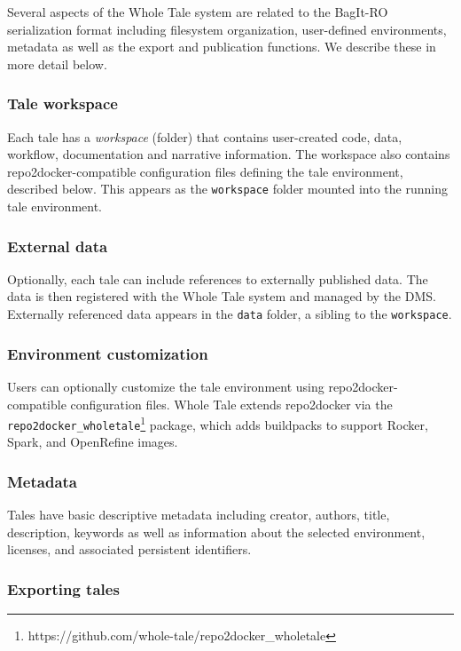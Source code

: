 \documentclass[conference]{IEEEtran}
\begin{document}
Several aspects of the Whole Tale system are related to the BagIt-RO serialization format including filesystem organization, user-defined environments, metadata as well as the export and publication functions. We describe these in more detail below.

\subsubsection{Tale workspace}
Each tale has a \emph{workspace} (folder) that contains user-created code, data, workflow, documentation and narrative information. The workspace also contains repo2docker-compatible configuration files defining the tale environment, described below. This appears as the \texttt{workspace} folder mounted into the running tale environment.

\subsubsection{External data}
Optionally, each tale can include references to externally published data. The data is then registered with the Whole Tale system and managed by the DMS. Externally referenced data appears in the \texttt{data} folder, a sibling to the \texttt{workspace}.

\subsubsection{Environment customization}
Users can optionally customize the tale environment using repo2docker-compatible configuration files. Whole Tale extends repo2docker via the \texttt{repo2docker\_wholetale}\footnote{https://github.com/whole-tale/repo2docker\_wholetale} package, which adds buildpacks to support Rocker, Spark, and OpenRefine images. 

\subsubsection{Metadata}

Tales have basic descriptive metadata including creator, authors, title, description, keywords as well as information about the selected environment, licenses, and associated persistent identifiers.

\subsubsection{Exporting tales}
\end{document}
